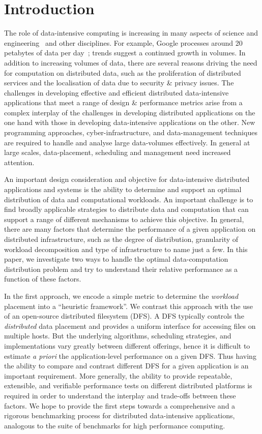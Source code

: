 \documentclass{rspublic}
\begin{document}
\vspace{-0.5cm}

\section{Introduction} 
The role of data-intensive computing is increasing in many aspects of
science and engineering~\citep{fourthparadigm} and other
disciplines. For example, Google processes around 20 petabytes of data
per day~\citep{google}; trends suggest a continued growth in
volumes. In addition to increasing volumes of data, there are several
reasons driving the need for computation on distributed data, such as
the proliferation of distributed services and the localisation of data
due to security \& privacy issues. The challenges in developing
effective and efficient distributed data-intensive applications that
meet a range of design \& performance metrics arise from a complex
interplay of the challenges in developing distributed applications on
the one hand with those in developing data-intensive applications on
the other. New programming approaches, cyber-infrastructure, and
data-management techniques are required to handle and analyse large
data-volumes effectively. In general at large scales, data-placement,
scheduling and management need increased attention.

An important design consideration and objective for data-intensive
distributed applications and systems is the ability to determine and
support an optimal distribution of data and computational
workloads. An important challenge is to find broadly applicable
strategies to distribute data and computation that can support a range
of different mechanisms to achieve this objective. In general, there
are many factors that determine the performance of a given application
on distributed infrastructure, such as the degree of distribution,
granularity of workload decomposition and type of infrastructure to
name just a few.  In this paper, we investigate two ways to handle the
optimal data-computation distribution problem and try to understand
their relative performance as a function of these factors.

In the first approach, we encode a simple metric to determine the {\it
  workload} placement into a ``heuristic framework''. We contrast this
approach with the use of an open-source distributed filesystem (DFS).
A DFS typically controls the {\it distributed} data placement and
provides a uniform interface for accessing files on multiple hosts.
But the underlying algorithms, scheduling strategies, and
implementations vary greatly between different offerings, hence it is
difficult to estimate {\it a priori} the application-level performance
on a given DFS.  Thus having the ability to compare and contrast
different DFS for a given application is an important requirement.
More generally, the ability to provide repeatable, extensible, and
verifiable performance tests on different distributed platforms is
required in order to understand the interplay and trade-offs between
these factors.  We hope to provide the first steps towards
a comprehensive and a rigorous benchmarking process for distributed
data-intensive applications, analogous to the suite of benchmarks for
high performance computing.
\end{document}
